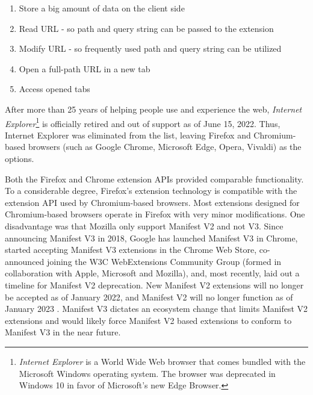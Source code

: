 \begin{enumerate}
  \item Store a big amount of data on the client side
  \item Read URL - so path and query string can be passed to the extension
  \item Modify URL - so frequently used path and query string can be utilized
  \item Open a full-path URL in a new tab
  \item Access opened tabs
\end{enumerate}

After more than 25 years of helping people use and experience the web, \emph{Internet Explorer}\footnote{\emph{Internet Explorer} is a World Wide Web browser that comes bundled with the Microsoft Windows operating system. The browser was deprecated in Windows 10 in favor of Microsoft's new Edge Browser.} is officially retired and out of support as of June 15, 2022. Thus, Internet Explorer was eliminated from the list, leaving Firefox and Chromium-based browsers (such as Google Chrome, Microsoft Edge, Opera, Vivaldi) as the options.

Both the Firefox and Chrome extension APIs provided comparable functionality. To a considerable degree, Firefox's extension technology is compatible with the extension API used by Chromium-based browsers. Most extensions designed for Chromium-based browsers operate in Firefox with very minor modifications. One disadvantage was that Mozilla only support Manifest V2 and not V3. Since announcing Manifest V3 in 2018, Google has launched Manifest V3 in Chrome, started accepting Manifest V3 extensions in the Chrome Web Store, co-announced joining the W3C WebExtensions Community Group (formed in collaboration with Apple, Microsoft and Mozilla), and, most recently, laid out a timeline for Manifest V2 deprecation. New Manifest V2 extensions will no longer be accepted as of January 2022, and Manifest V2 will no longer function as of January 2023 \autocite{alexei2021manifest}. Manifest V3 dictates an ecosystem change that limits Manifest V2 extensions and would likely force Manifest V2 based extensions to conform to Manifest V3 in the near future.


